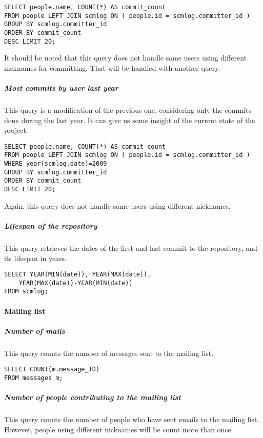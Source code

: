 \begin{verbatim}
SELECT people.name, COUNT(*) AS commit_count 
FROM people LEFT JOIN scmlog ON ( people.id = scmlog.committer_id ) 
GROUP BY scmlog.committer_id 
ORDER BY commit_count 
DESC LIMIT 20;
\end{verbatim}

It should be noted that this query does not handle same users using different nicknames for committing. That will be handled with another query.

\subparagraph{Most commits by user last year}

This query is a modification of the previous one, considering only the commits done during the last year. It can give us some insight of the current state of the project. 

\begin{verbatim}
SELECT people.name, COUNT(*) AS commit_count 
FROM people LEFT JOIN scmlog ON ( people.id = scmlog.committer_id ) 
WHERE year(scmlog.date)=2009 
GROUP BY scmlog.committer_id 
ORDER BY commit_count 
DESC LIMIT 20;
\end{verbatim}

Again, this query does not handle same users using different nicknames.

\subparagraph{Lifespan of the repository}

This query retrieves the dates of the first and last commit to the repository, and its lifespan in years.

\begin{verbatim}
SELECT YEAR(MIN(date)), YEAR(MAX(date)), 
	YEAR(MAX(date))-YEAR(MIN(date))
FROM scmlog;
\end{verbatim}

\paragraph{Mailing list}

\subparagraph{Number of mails}

This query counts the number of messages sent to the mailing list.

\begin{verbatim}
SELECT COUNT(m.message_ID)
FROM messages m;
\end{verbatim}

\subparagraph{Number of people contributing to the mailing list}

This query counts the number of people who have sent emails to the mailing list. However, people using different nicknames will be count more than once.

